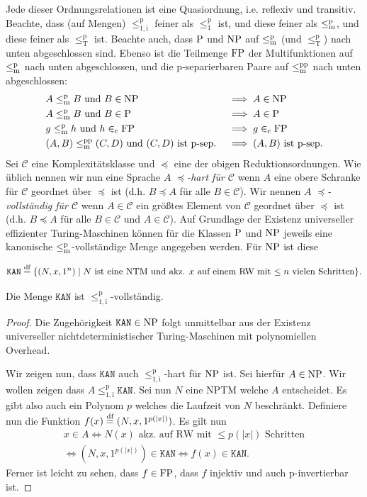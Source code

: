 Jede dieser Ordnungsrelationen ist eine Quasiordnung, i.e. reflexiv und transitiv.
Beachte, dass (auf Mengen) $\leq_\mathrm{1,i}^\mathrm{p}$ feiner als $\leq_1^\mathrm{p}$ ist, und diese feiner als $\leqmp$, und diese feiner als $\leq_\mathrm{T}^\mathrm p$ ist.
Beachte auch, dass $\P$ und $\NP$ auf $\leqmp$ (und $\leq_\mathrm T^\mathrm p$) nach unten abgeschlossen sind.
Ebenso ist die Teilmenge $\FP$ der Multifunktionen auf $\leqmp$ nach unten abgeschlossen, und die p-separierbaren Paare auf $\leqmpp$ nach unten abgeschlossen:
\begin{alignat*}{2}
    &A\leqmp B \text{ und } B\in\NP &&\implies A\in\NP\\
    &A\leqmp B \text{ und } B\in\P &&\implies A\in\P\\
    &g\leqmp h \text{ und } h\inc\FP &&\implies g\inc\FP\\
    &(A,B)\leqmpp (C,D) \text{ und $(C,D)$ ist p-sep.} &&\implies \text{$(A,B)$ ist p-sep.}
\end{alignat*}
Sei $\mathcal C$ eine Komplexitätsklasse und $\preceq$ eine der obigen Reduktionsordnungen.
Wie üblich nennen wir nun eine Sprache $A$ \emph{$\preceq$-hart für $\mathcal C$} wenn $A$ eine obere Schranke für $\mathcal C$ geordnet über $\preceq$  ist (d.h. $B\preceq A$ für alle $B\in\mathcal C$).
Wir nennen $A$ \emph{$\preceq$-vollständig für $\mathcal C$} wenn $A\in\mathcal C$ ein größtes Element von $\mathcal C$ geordnet über $\preceq$ ist (d.h. $B\preceq A$ für alle $B\in\mathcal C$ und $A\in\mathcal C$).
Auf Grundlage der Existenz universeller effizienter Turing-Maschinen können für die Klassen $\P$ und $\NP$ jeweils eine kanonische $\leqmp$-vollständige Menge angegeben werden. Für $\NP$ ist diese
\begin{definition}
\[ \mathtt{KAN} \defeq \{ (N, x, 1^n) \mid \text{$N$ ist eine NTM und akz. $x$ auf einem RW mit $\leq n$ vielen Schritten} \}.\qedhere \]
\end{definition}
\begin{lemma}
    Die Menge $\mathtt{KAN}$ ist $\leq_\mathrm{1,i}^\mathrm{p}$-vollständig.
\end{lemma}
\begin{proof}
    Die Zugehörigkeit $\mathtt{KAN}\in\NP$ folgt unmittelbar aus der Existenz universeller nichtdeterministischer Turing-Maschinen mit polynomiellen Overhead.

    Wir zeigen nun, dass $\mathtt{KAN}$ auch $\leq_\mathrm{1,i}^\mathrm{p}$-hart für $\NP$ ist.
    Sei hierfür $A\in\NP$. Wir wollen zeigen dass $A \leq_\mathrm{1,i}^\mathrm{p} \mathtt{KAN}$. Sei nun $N$ eine NPTM welche $A$ entscheidet. Es gibt also auch ein Polynom $p$ welches die Laufzeit von $N$ beschränkt.
    Definiere nun die Funktion $f(x) \defeq (N, x, 1^{p(|x|)})$. Es gilt nun
    \begin{gather*}
        x\in A \iff N(x)\text{ akz. auf RW mit $\leq p(|x|)$ Schritten}\\
        \iff (N, x, 1^{p(|x|)}) \in \mathtt{KAN} \iff f(x) \in \mathtt{KAN}.
    \end{gather*}
    Ferner ist leicht zu sehen, dass $f\in \FP$, dass $f$ injektiv und auch p-invertierbar ist.
\end{proof}


